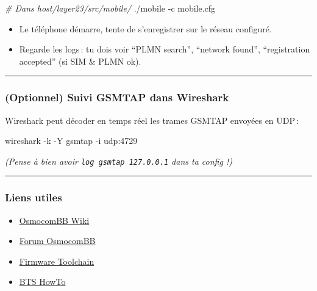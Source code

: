 \documentclass[
]{article}
\newenvironment{Shaded}{\begin{snugshade}}{\end{snugshade}}
\newcommand{\AttributeTok}[1]{\textcolor[rgb]{0.13,0.29,0.53}{#1}}
\newcommand{\CommentTok}[1]{\textcolor[rgb]{0.56,0.35,0.01}{\textit{#1}}}
\newcommand{\ExtensionTok}[1]{#1}
\newcommand{\NormalTok}[1]{#1}
\providecommand{\tightlist}{%
  \setlength{\itemsep}{0pt}\setlength{\parskip}{0pt}}
\begin{document}
\begin{Shaded}
\begin{Highlighting}[]
\CommentTok{\# Dans host/layer23/src/mobile/}
\ExtensionTok{./mobile} \AttributeTok{{-}c}\NormalTok{ mobile.cfg}
\end{Highlighting}
\end{Shaded}

\begin{itemize}
\tightlist
\item
  Le téléphone démarre, tente de s'enregistrer sur le réseau configuré.
\item
  Regarde les logs\,: tu dois voir ``PLMN search'', ``network found'',
  ``registration accepted'' (si SIM \& PLMN ok).
\end{itemize}

\begin{center}\rule{0.5\linewidth}{0.5pt}\end{center}

\subsubsection{(Optionnel) Suivi GSMTAP dans
Wireshark}\label{optionnel-suivi-gsmtap-dans-wireshark}

Wireshark peut décoder en temps réel les trames GSMTAP envoyées en
UDP\,:

\begin{Shaded}
\begin{Highlighting}[]
\ExtensionTok{wireshark} \AttributeTok{{-}k} \AttributeTok{{-}Y}\NormalTok{ gsmtap }\AttributeTok{{-}i}\NormalTok{ udp:4729}
\end{Highlighting}
\end{Shaded}

\emph{(Pense à bien avoir \texttt{log\ gsmtap\ 127.0.0.1} dans ta config
!)}

\begin{center}\rule{0.5\linewidth}{0.5pt}\end{center}

\subsubsection{Liens utiles}\label{liens-utiles-1}

\begin{itemize}
\tightlist
\item
  \href{https://osmocom.org/projects/baseband/wiki}{OsmocomBB Wiki}
\item
  \href{https://lists.osmocom.org/mailman/listinfo/baseband-devel}{Forum
  OsmocomBB}
\item
  \href{https://downloads.osmocom.org/binaries/toolchain/}{Firmware
  Toolchain}
\item
  \href{https://osmocom.org/projects/baseband/wiki/CalypsoBTS}{BTS
  HowTo}
\end{itemize}
\end{document}
